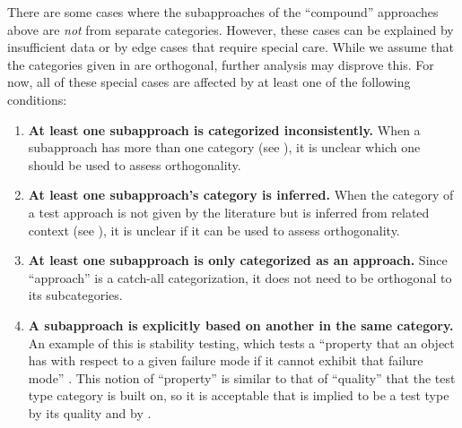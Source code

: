     There are some cases where the subapproaches of the ``compound'' approaches
    above are \emph{not} from separate categories. However, these cases can be
    explained by insufficient data or by edge cases that require special care.
    While we assume that the categories given in  are
    orthogonal, further analysis may disprove this. For now, all of these special
    cases are affected by at least one of the following conditions:
    \begin{enumerate}
        \item \textbf{At least one subapproach is categorized inconsistently.}
              When a subapproach has more than one category (see ),
              it is unclear which one should be used to assess orthogonality.
        \item \textbf{At least one subapproach's category is inferred.} When the category
              of a test approach is not given by the literature but is inferred
              from related context (see ), it is unclear if it can
              be used to assess orthogonality.
        \item \textbf{At least one subapproach is only categorized as an approach.}
              Since ``approach'' is a catch-all categorization, it does not
              need to be orthogonal to its subcategories.
        \item \textbf{A subapproach is explicitly based on another in the same
                  category.} An example of this is stability testing, which
              tests a ``property that an object has with respect to a given
              failure mode if it cannot exhibit that failure mode''
              \citep[p.~434]{IEEE2017}. This notion of
              ``property'' is similar to that of ``quality'' that the test type
              category is built on, so it is acceptable that is implied to be
              a test type by its quality \citep[p.~434]{IEEE2017}%
               and by \citet[p.~55]{Firesmith2015}.
    \end{enumerate}
\fi

